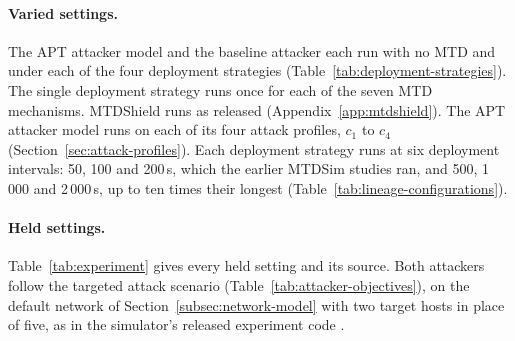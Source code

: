\documentclass{cshonours}
\begin{document}
\paragraph{Varied settings.} The APT attacker model and the baseline attacker
each run with no MTD and under each of the four deployment strategies
(Table~\ref{tab:deployment-strategies}). The single deployment strategy runs
once for each of the seven MTD mechanisms. MTDShield runs as released (Appendix~\ref{app:mtdshield}). The APT
attacker model runs on each of its four attack profiles, $c_1$ to $c_4$
(Section~\ref{sec:attack-profiles}). Each deployment strategy runs at six
deployment intervals: 50, 100 and 200\,s, which the earlier MTDSim studies
ran, and 500, 1\,000 and 2\,000\,s, up to ten times their longest
(Table~\ref{tab:lineage-configurations}).



\paragraph{Held settings.} Table~\ref{tab:experiment} gives every held
setting and its source. Both attackers follow the targeted attack scenario
(Table~\ref{tab:attacker-objectives}), on the default network of
Section~\ref{subsec:network-model} with two target hosts in place of five,
as in the simulator's released experiment code \citep{tay2024code}.
\end{document}
